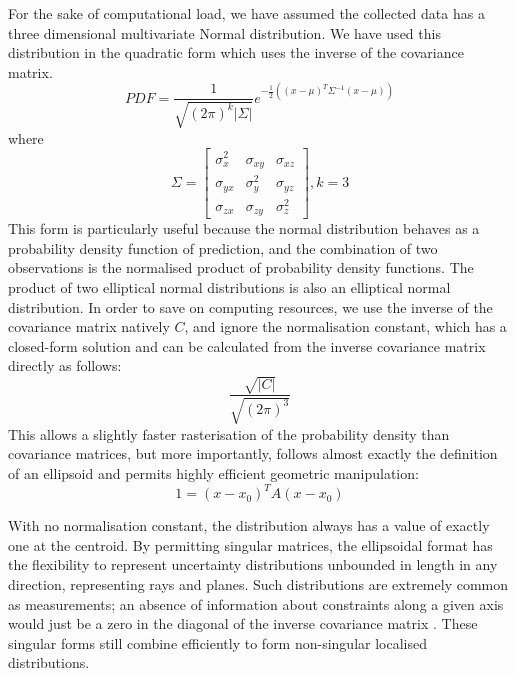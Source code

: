 \documentclass[a4paper, 11pt, titlepage]{article}
\newcounter{subsubsubsection}[subsubsection]
\begin{document}
        For the sake of computational load, we have assumed the collected data has a three dimensional multivariate Normal distribution.  We have used this distribution in the quadratic form which uses the inverse of the covariance matrix.
        \begin{equation}
        PDF = \frac{1}{\sqrt {(2\pi)^k|\Sigma|}} e^{-\frac{1}{2}\left( \left(x-\mu\right)^T \Sigma^{-1} \left(x-\mu\right) \right)}
        \end{equation}
        where
        \begin{equation}
        \Sigma=\begin{bmatrix}
          \sigma_x^2 & \sigma_{xy} & \sigma_{xz} \\[0.3em]
          \sigma_{yx} & \sigma_y^2 & \sigma_{yz} \\[0.3em]
          \sigma_{zx} & \sigma_{zy} & \sigma_z^2 
        \end{bmatrix}, k=3
        \end{equation}
        This form is particularly useful because the normal distribution behaves as a probability density function of prediction, and the combination of two observations is the normalised product of probability density functions.  The product of two elliptical normal distributions is also an elliptical normal distribution.  
        In order to save on computing resources, we use the inverse of the covariance matrix natively \(C\), and ignore the normalisation constant, which has a closed-form solution and can be calculated from the inverse covariance matrix directly as follows:
        \begin{equation}
        \frac{\sqrt{|C|}}{\sqrt{(2\pi)^3}}
        \end{equation}
        This allows a slightly faster rasterisation of the probability density than covariance matrices, but more importantly, follows almost exactly the definition of an ellipsoid and permits highly efficient geometric manipulation:
        \begin{equation}
        1 = \left(x-x_0\right)^T A \left(x-x_0\right)
        \end{equation}

        With no normalisation constant, the distribution always has a value of exactly one at the centroid.
        By permitting singular matrices, the ellipsoidal format has the flexibility to represent uncertainty distributions unbounded in length in any direction, representing rays and planes.  Such distributions are extremely common as measurements; an absence of information about constraints along a given axis would just be a zero in the diagonal of the inverse covariance matrix \cite{UncertainGeo}.  These singular forms still combine efficiently to form non-singular localised distributions.
        
\end{document}
